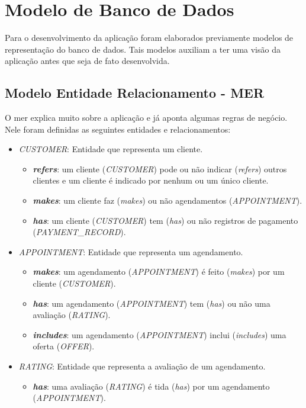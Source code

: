 \section{Modelo de Banco de Dados}
Para o desenvolvimento da aplicação foram elaborados previamente modelos de representação do banco de dados. Tais modelos auxiliam a ter uma visão da aplicação antes que seja de fato desenvolvida.
\subsection{Modelo Entidade Relacionamento - MER}
O \gls{mer} explica muito sobre a aplicação e já aponta algumas regras de negócio.
Nele foram definidas as seguintes entidades e relacionamentos:

\begin{itemize}
	\item \emph{CUSTOMER}: Entidade que representa um cliente.
	\begin{itemize}
		\item \textbf{\textit{refers}}: um cliente (\emph{CUSTOMER}) pode ou não indicar (\textit{refers}) outros clientes e um cliente é indicado por nenhum ou um único cliente.
		\item \textbf{\textit{makes}}: um cliente faz (\emph{makes}) ou não agendamentos (\emph{APPOINTMENT}).
		\item \textbf{\textit{has}}: um cliente (\emph{CUSTOMER}) tem (\textit{has}) ou não registros de pagamento (\emph{PAYMENT\_RECORD}).
	\end{itemize}
	\item \emph{APPOINTMENT}: Entidade que representa um agendamento.
	\begin{itemize}
		\item \textbf{\textit{makes}}: um agendamento (\emph{APPOINTMENT}) é feito (\textit{makes}) por um cliente (\emph{CUSTOMER}). 
		\item \textbf{\textit{has}}: um agendamento (\emph{APPOINTMENT}) tem (\textit{has}) ou não uma avaliação (\emph{RATING}).
		\item \textbf{\textit{includes}}: um agendamento (\emph{APPOINTMENT}) inclui (\textit{includes}) uma oferta (\emph{OFFER}).
	\end{itemize}
	\item \emph{RATING}: Entidade que representa a avaliação de um agendamento.
	\begin{itemize}
		\item \textbf{\textit{has}}: uma avaliação (\emph{RATING}) é tida (\textit{has}) por um agendamento (\emph{APPOINTMENT}).

\end{itemize}
\end{itemize}
